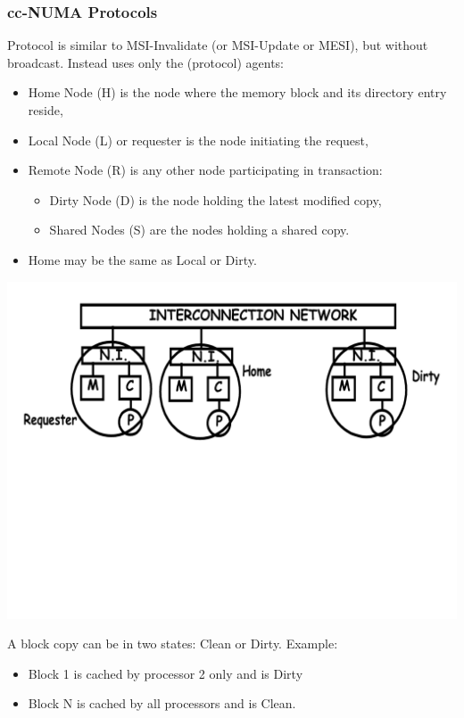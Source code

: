 \documentclass{beamer}
\renewcommand{\emph}[1]{\textcolor{structure}{#1}}
\newcommand{\emp}[1]{\textcolor{DikuRed}{ #1}}
\begin{document}
\begin{frame}[fragile,t]
\frametitle{cc-NUMA Protocols}

Protocol is similar to MSI-Invalidate (or MSI-Update or MESI),
but without broadcast.
Instead uses only the (protocol) agents:
\begin{itemize}
    \item \emph{Home Node (H)} is the node where the memory block and its 
            directory entry reside,
    \item \emph{Local Node (L)} or requester is the node initiating the request,
    \item \emp{Remote Node (R)} is any other node participating in transaction:
        \begin{itemize}
            \item \emp{Dirty Node (D)} is the node holding the latest modified copy,
            \item \emp{Shared Nodes (S)} are the nodes holding a shared copy. 
        \end  {itemize}
    \item Home may be the same as Local or Dirty.
\end  {itemize}

\includegraphics[width=55ex]{FigsInfCoherence/ccNUMA}
\vspace{-1ex}

A block copy can be in two states: Clean or Dirty. Example:
\begin{itemize}
    \item Block 1 is cached by processor 2 only and is Dirty
    \item Block N is cached by all processors and is Clean.
\end  {itemize}

\end{frame}
\end{document}
